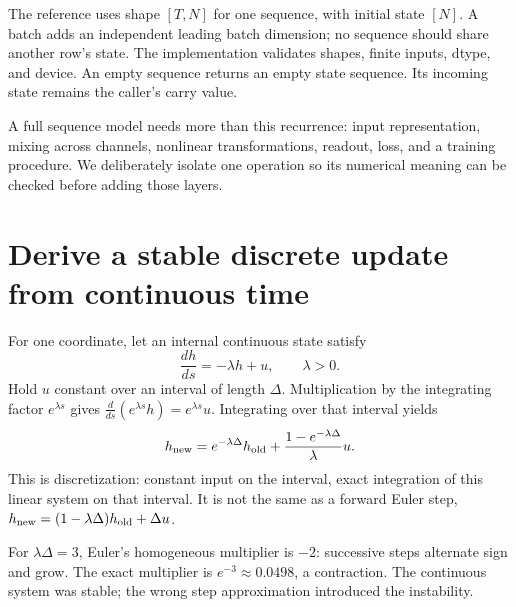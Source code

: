 
The reference uses shape $[T,N]$ for one sequence, with initial state
$[N]$. A batch adds an independent leading batch dimension; no sequence
should share another row's state. The implementation validates shapes,
finite inputs, dtype, and device. An empty sequence returns an empty
state sequence. Its incoming state remains the caller's carry value.


A full sequence model needs more than this recurrence: input representation,
mixing across channels, nonlinear transformations, readout, loss, and a
training procedure. We deliberately isolate one operation so its numerical
meaning can be checked before adding those layers.

\section{Derive a stable discrete update from continuous time}

For one coordinate, let an internal continuous state satisfy
\begin{equation}
 \frac{dh}{ds}=-\lambda h+u,\qquad \lambda>0.
 \label{eq:continuous}
\end{equation}
Hold $u$ constant over an interval of length $\Delta$.
Multiplication by the integrating factor $e^{\lambda s}$ gives
$\frac{d}{ds}(e^{\lambda s}h)=e^{\lambda s}u$.
Integrating over that interval yields
\begin{equation}
 h_{\rm new}=e^{-\lambda\Delta}h_{\rm old}
       +\frac{1-e^{-\lambda\Delta}}{\lambda}u.
 \label{eq:zoh}
\end{equation}
This is  discretization: constant input on the
interval, exact integration of this linear system on that interval.
It is not the same as a forward Euler step,
$h_{\rm new}=(1-\lambda\Delta)h_{\rm old}+\Delta u$.

For $\lambda\Delta=3$, Euler's homogeneous multiplier is $-2$:
successive steps alternate sign and grow. The exact multiplier is
$e^{-3}\approx0.0498$, a contraction. The continuous system was stable;
the wrong step approximation introduced the instability.


